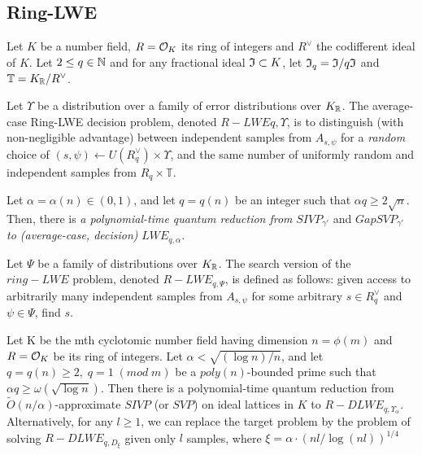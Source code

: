 \documentclass[Ingles]{ic-tese-v3}
\begin{document}
\subsection{Ring-LWE}
\label{sec:orgdc06995}
Let \(K\) be a number field, \(R = \mathcal{O}_K\) its ring of integers and \(R^\vee\) the
codifferent ideal of \(K\). Let \(2 \leq q \in \mathbb{N}\) and for any fractional ideal \(\mathfrak{I} \subset
    K\), let \(\mathfrak{I}_q = \mathfrak{I}/q\mathfrak{I}\) and \(\mathbb{T} = K_{\mathbb{R}}/R^\vee\).  

\begin{definition}
  \label{def:rlwe-decision}
  Let $\Upsilon$ be a distribution over a family of error distributions over $K_{\mathbb{R}}$.
  The average-case Ring-LWE decision problem, denoted $R-LWE{q,\Upsilon}$, is to
  distinguish (with non-negligible advantage) between independent samples from
  $A_{s, \psi}$ for a \textit{random} choice of $(s,\psi) \longleftarrow U(R_q^\vee) \times \Upsilon$, and the
  same number of uniformly random and independent samples from $R_q \times \mathbb{T}$.
\end{definition}

\begin{theorem}
  Let $\alpha = \alpha(n) \in (0, 1)$, and let $q = q(n)$ be an integer such that $\alpha q \geq 
  2\sqrt{n}$. Then, there is \emph{a polynomial-time quantum reduction from} $SIVP_{\gamma'}$
  and $GapSVP_{\gamma'}$ \emph{to (average-case, decision)} $LWE_{q,\alpha}$.
\end{theorem}

\begin{definition}
  \label{def:rlwe-search}
Let $\Psi$ be a family of distributions over $K_{\mathbb{R}}$. The search version of the $ring-LWE$ problem, denoted $R-LWE_{q,\Psi}$, is defined as follows: given access to arbitrarily many independent samples from $A_{s,\psi}$ for some arbitrary $s \in R_q^\vee$ and $\psi \in \Psi$, find $s$.
\end{definition}

\begin{theorem}
  Let K be the mth cyclotomic number field having dimension $n = \phi(m)$ and $R =
  \mathcal{O}_K$ be its ring of integers. Let $\alpha < \sqrt{(\log{n})/n}$, and let $q = q(n)
  \geq 2, \; q = 1 \; (mod \; m)$ be a $poly(n)$-bounded prime such that $\alpha q \geq
  \omega(\sqrt{\log{n}})$. Then there is a polynomial-time quantum reduction from
  $\tilde{O}(n/\alpha)$-approximate $SIVP$ (or $SVP$) on ideal lattices in $K$ to
  $R-DLWE_{q,\Upsilon_\alpha}$. Alternatively, for any $l \geq 1$, we can replace the target
  problem by the problem of solving $R-DLWE_{q,D_\xi}$ given only $l$ samples,
  where $\xi = \alpha \cdot ( nl/ \log{(nl)} )^{1/4}$
\end{theorem}
\end{document}
